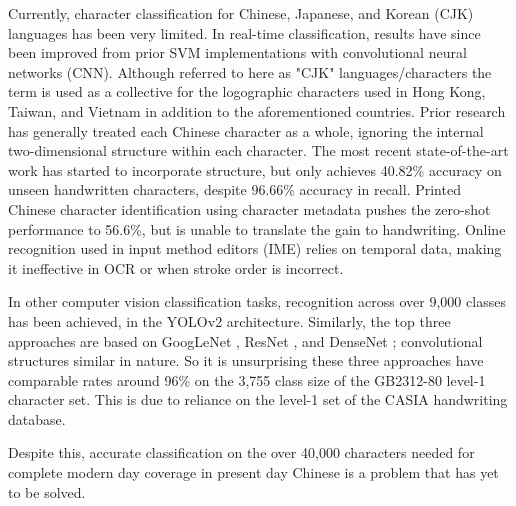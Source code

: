 Currently, character classification for Chinese, Japanese, and Korean (CJK) languages has been very limited. In real-time classification, results have since been improved from prior SVM implementations with convolutional neural networks (CNN). Although referred to here as "CJK" languages/characters the term is used as a collective for the logographic characters used in Hong Kong, Taiwan, and Vietnam in addition to the aforementioned countries. Prior research has generally treated each Chinese character as a whole, ignoring the internal two-dimensional structure within each character. The most recent state-of-the-art work has started to incorporate structure, but only achieves 40.82\% accuracy on unseen handwritten characters, despite 96.66\% accuracy in recall\cite{denseran}. Printed Chinese character identification using character metadata pushes the zero-shot performance to 56.6\%\cite{multi-attribute-recognition}, but is unable to translate the gain to handwriting. Online recognition used in input method editors (IME) relies on temporal data\cite{online-handwriting}, making it ineffective in OCR or when stroke order is incorrect.

In other computer vision classification tasks, recognition across over 9,000 classes has been achieved, in the YOLOv2 architecture\cite{yolo}. Similarly, the top three approaches are based on GoogLeNet \cite{hccr-googlenet}, ResNet \cite{multi-attribute-recognition}, and DenseNet \cite{denseran}; convolutional structures similar in nature. So it is unsurprising these three approaches have comparable rates around 96\% on the 3,755 class size of the GB2312-80 level-1 character set. This is due to reliance on the level-1 set of the CASIA handwriting database\cite{casia-handwriting-db}.

Despite this, accurate classification on the over 40,000 characters needed for complete modern day coverage in present day Chinese is a problem that has yet to be solved.

%
%
